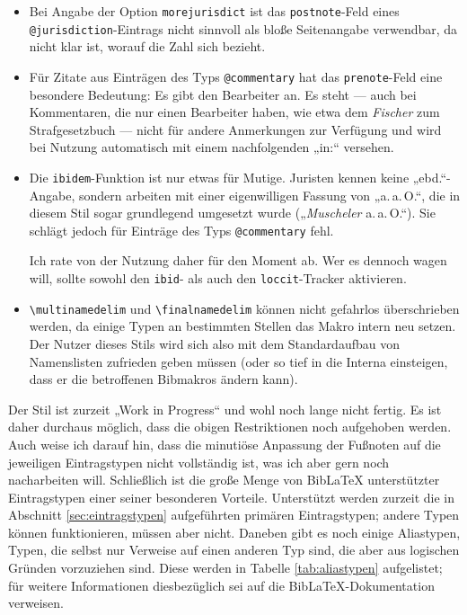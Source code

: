 \documentclass[11pt,a4paper,DIV=calc]{scrartcl}
\newcommand\software[1]{\textsf{#1}}
\newcommand\Biblatex{\software{Bib\LaTeX{}}\xspace}
\begin{document}
\begin{itemize}
\item Bei Angabe der Option \verb+morejurisdict+ ist das
  \verb+postnote+-Feld eines \verb+@jurisdiction+-Eintrags nicht
  sinnvoll als bloße Seitenangabe verwendbar, da nicht klar ist,
  worauf die Zahl sich bezieht.
\item Für Zitate aus Einträgen des Typs \verb+@commentary+ hat das
  \verb+prenote+-Feld eine besondere Bedeutung: Es gibt den Bearbeiter
  an. Es steht — auch bei Kommentaren, die nur einen Bearbeiter haben,
  wie etwa dem \emph{Fischer} zum Strafgesetzbuch — nicht für andere
  Anmerkungen zur Verfügung und wird bei Nutzung automatisch mit einem
  nachfolgenden „in:“ versehen.
\item Die \verb+ibidem+-Funktion ist nur etwas für Mutige. Juristen
  kennen keine „ebd.“-Angabe, sondern arbeiten mit einer eigenwilligen
  Fassung von „a.\,a.\,O.“, die in diesem Stil sogar grundlegend umgesetzt
  wurde („\textit{Muscheler} a.\,a.\,O.“). Sie schlägt jedoch für Einträge
  des Typs \verb+@commentary+ fehl.

  Ich rate von der Nutzung daher für den Moment ab. Wer es dennoch
  wagen will, sollte sowohl den \verb+ibid+- als auch den
  \verb+loccit+-Tracker aktivieren.
\item \verb+\multinamedelim+ und \verb+\finalnamedelim+ können nicht
  gefahrlos überschrieben werden, da einige Typen an bestimmten
  Stellen das Makro intern neu setzen. Der Nutzer dieses Stils wird
  sich also mit dem Standardaufbau von Namenslisten zufrieden geben
  müssen (oder so tief in die Interna einsteigen, dass er die
  betroffenen Bibmakros ändern kann).
\end{itemize}

Der Stil ist zurzeit „Work in Progress“ und wohl noch lange nicht
fertig. Es ist daher durchaus möglich, dass die obigen Restriktionen
noch aufgehoben werden. Auch weise ich darauf hin, dass die minutiöse
Anpassung der Fußnoten auf die jeweiligen Eintragstypen nicht
vollständig ist, was ich aber gern noch nacharbeiten will. Schließlich
ist die große Menge von \Biblatex unterstützter Eintragstypen einer
seiner besonderen Vorteile. Unterstützt werden zurzeit die in
Abschnitt \ref{sec:eintragstypen} aufgeführten primären Eintragstypen;
andere Typen können funktionieren, müssen aber nicht. Daneben gibt es
noch einige Aliastypen, \dh Typen, die selbst nur Verweise auf einen
anderen Typ sind, die aber aus logischen Gründen vorzuziehen
sind. Diese werden in Tabelle \ref{tab:aliastypen} aufgelistet; für
weitere Informationen diesbezüglich sei auf die
\Biblatex-Do\-ku\-men\-ta\-tion verweisen.
\end{document}
